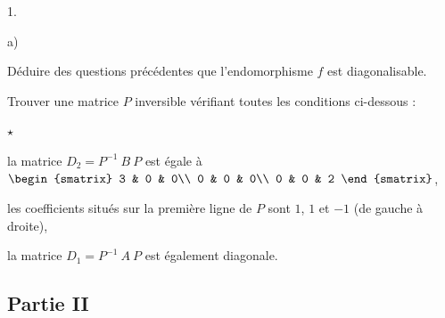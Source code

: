 \documentclass[11pt]{article}%
\begin{document}
\begin{noliste}{1.}
\begin{noliste}{a)}
    
    
  \item Déduire des questions précédentes que l'endomorphisme $f$ est
    diagonalisable.

    
  \end{noliste}
  
\item Trouver une matrice $P$ inversible vérifiant toutes les
  conditions ci-dessous :
  \begin{noliste}{$\star$}
  \item la matrice $D_{2} = P^{-1} \ B \ P$ est égale à
    $\begin{smatrix}
      3 & 0 & 0\\
      0 & 0 & 0\\
      0 & 0 & 2
    \end{smatrix}
    $,
  \item les coefficients situés sur la première ligne de $P$ sont $1$,
    $1$ et $-1$ (de gauche à droite),
  \item la matrice $D_{1} = P^{-1}\ A \ P$ est également diagonale.
  \end{noliste}

  
\end{noliste}

\subsection*{Partie II} 
\end{document}
